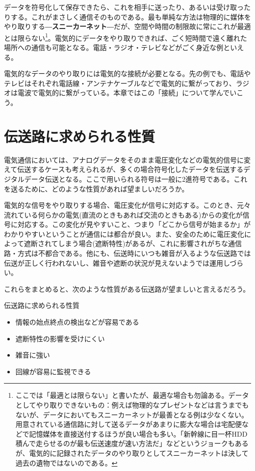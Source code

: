 データを符号化して保存できたら、これを相手に送ったり、あるいは受け取ったりする。これがまさしく通信そのものである。最も単純な方法は物理的に媒体をやり取りする―\textbf{スニーカーネット}―だが、空間や時間の制限故に常にこれが最適とは限らない\footnote{ここでは「最適とは限らない」と書いたが、最適な場合も勿論ある。データとしてやり取りできないもの：例えば物理的なプレゼントなどは言うまでもないが、データにおいてもスニーカーネットが最善となる例は少なくない。用意されている通信路に対して送るデータがあまりに膨大な場合は宅配便などで記憶媒体を直接送付するほうが良い場合も多い。「新幹線に目一杯HDD積んで走らせるのが最も伝送速度が速い方法だ」などというジョークもあるが、電気的に記録されたデータのやり取りとしてスニーカーネットは決して過去の遺物ではないのである。}。電気的にデータをやり取りできれば、ごく短時間で遠く離れた場所への通信も可能となる。電話・ラジオ・テレビなどがごく身近な例といえる。

電気的なデータのやり取りには電気的な接続が必要となる。先の例でも、電話やテレビはそれぞれ電話線・アンテナケーブルなどで電気的に繋がっており、ラジオは電波で電気的に繋がっている。本章ではこの「接続」について学んでいこう。

\section{伝送路に求められる性質}
電気通信においては、アナログデータをそのまま電圧変化などの電気的信号に変えて伝送するケースも考えられるが、多くの場合符号化したデータを伝送するデジタルデータ伝送となる。ここで用いられる符号は一般に2進符号である。これを送るために、どのような性質があれば望ましいだろうか。

電気的な信号をやり取りする場合、電圧変化が信号に対応する。このとき、元々流れている何らかの電気(直流のときもあれば交流のときもある)からの変化が信号に対応する。この変化が見やすいこと、つまり「どこから信号が始まるか」がわかりやすいということが通信には都合が良い。また、安全のために電圧変化によって遮断されてしまう場合(遮断特性)があるが、これに影響されがちな通信路・方式は不都合である。他にも、伝送時にいつも雑音が入るような伝送路では伝送が正しく行われないし、雑音や遮断の状況が見えないようでは運用しづらい。

これらをまとめると、次のような性質がある伝送路が望ましいと言えるだろう。

\begin{itembox}[l]{伝送路に求められる性質}
\begin{itemize}
\item 情報の始点終点の検出などが容易である
\item 遮断特性の影響を受けにくい
\item 雑音に強い
\item 回線が容易に監視できる
\end{itemize}
\end{itembox}

